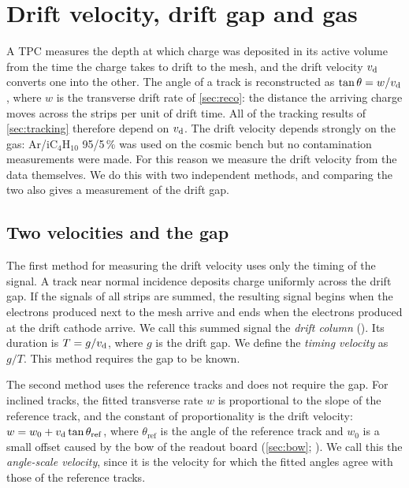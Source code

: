 \section{Drift velocity, drift gap and gas}\label{sec:gas}

A TPC measures the depth at which charge was deposited in its active volume from the time the charge takes to drift to the mesh, and the drift velocity $v_\mathrm{d}$ converts one into the other. The angle of a track is reconstructed as $\tan\theta=w/v_\mathrm{d}$, where
$w$ is the transverse drift rate of \cref{sec:reco}: the distance the arriving charge moves across the strips per unit
of drift time. All of the tracking results of \cref{sec:tracking} therefore depend on $v_\mathrm{d}$. The drift velocity depends
strongly on the gas: Ar/iC$_4$H$_{10}$ 95/5\,\% was used on the cosmic bench but no contamination measurements were made.
For this reason we measure the drift velocity from the data themselves. We do this with two independent methods, and
comparing the two also gives a measurement of the drift gap.

\subsection{Two velocities and the gap}\label{sec:gap}
The first method for measuring the drift velocity uses only the timing of the signal. A track near normal incidence deposits charge uniformly across the drift gap. If the signals of all strips are summed, the resulting signal begins when the electrons produced next
to the mesh arrive and ends when the electrons produced at the drift cathode arrive. We call this summed signal the
\emph{drift column} (). Its duration is $T=g/v_\mathrm{d}$, where $g$ is the drift gap. We define the
\emph{timing velocity} as $g/T$. This method requires the gap to be known.

The second method uses the reference tracks and does not require the gap. For inclined tracks, the fitted transverse
rate $w$ is proportional to the slope of the reference track, and the constant of proportionality is the drift
velocity: $w=w_0+v_\mathrm{d}\tan\theta_\mathrm{ref}$, where $\theta_\mathrm{ref}$ is the angle of the reference track and $w_0$
is a small offset caused by the bow of the readout board (\cref{sec:bow}; ). We call this the \emph{angle-scale velocity}, since it is the velocity for which the
fitted angles agree with those of the reference tracks.

